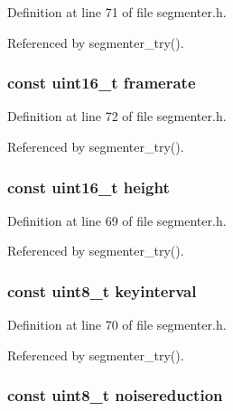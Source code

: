 \-Definition at line 71 of file segmenter.\-h.



\-Referenced by segmenter\-\_\-try().

\hypertarget{struct_video_params_a1d547da47827122cb857d138cd40d03d}{
\subsubsection[{framerate}]{\setlength{\rightskip}{0pt plus 5cm}const uint16\-\_\-t {\bf framerate}}}\label{struct_video_params_a1d547da47827122cb857d138cd40d03d}


\-Definition at line 72 of file segmenter.\-h.



\-Referenced by segmenter\-\_\-try().

\hypertarget{struct_video_params_a08b719f21fdd4b4a8646070080cccbf9}{
\subsubsection[{height}]{\setlength{\rightskip}{0pt plus 5cm}const uint16\-\_\-t {\bf height}}}\label{struct_video_params_a08b719f21fdd4b4a8646070080cccbf9}


\-Definition at line 69 of file segmenter.\-h.



\-Referenced by segmenter\-\_\-try().

\hypertarget{struct_video_params_a742eca362410fabc25b1403e42afdf6f}{
\subsubsection[{keyinterval}]{\setlength{\rightskip}{0pt plus 5cm}const uint8\-\_\-t {\bf keyinterval}}}\label{struct_video_params_a742eca362410fabc25b1403e42afdf6f}


\-Definition at line 70 of file segmenter.\-h.



\-Referenced by segmenter\-\_\-try().

\hypertarget{struct_video_params_a55d36111de9687dc3e70d2aaeb13c47f}{
\subsubsection[{noisereduction}]{\setlength{\rightskip}{0pt plus 5cm}const uint8\-\_\-t {\bf noisereduction}}}\label{struct_video_params_a55d36111de9687dc3e70d2aaeb13c47f}


